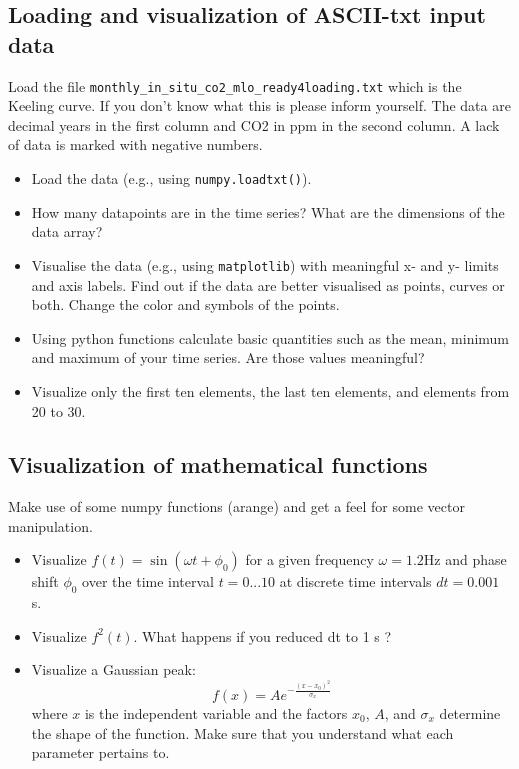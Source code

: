 \subsection{Loading and visualization of ASCII-txt input data}
\label{sec:viskeeling}
Load the file \verb|monthly_in_situ_co2_mlo_ready4loading.txt| which is the Keeling curve. If you don't know what this is please inform yourself. The data are decimal years in the first column and CO2 in ppm in the second column. A lack of data is marked with negative numbers.
\begin{itemize}
\item Load the data (e.g., using \verb|numpy.loadtxt()|).
\item How many datapoints are in the time series? What are the dimensions of the data array?
\item Visualise the data (e.g., using \verb|matplotlib|) with  meaningful x- and y- limits and axis labels. Find out if the data are better visualised as points, curves or both. Change the color and symbols of the points.
\item Using python functions calculate basic quantities such as the mean, minimum and maximum of your time series. Are those values meaningful?
\item Visualize only the first ten elements, the last ten elements, and elements from 20 to 30.
\end{itemize}

\subsection{Visualization of mathematical functions}
\label{sec:mathfunc}
Make use of some numpy functions (arange) and get a feel for some vector manipulation.
\begin{itemize}
  \item Visualize $f(t)=\sin(\omega t + \phi_0)$ for a given frequency $\omega=1.2$Hz and phase shift $\phi_0$ over the time interval $t=0...10$ at discrete time intervals $dt=0.001$ s.
  \item Visualize $f^2(t)$. What happens if you reduced dt to 1 s ?
  \item Visualize a Gaussian peak:
  $$
  f(x) = Ae^{-\frac{(x-x_0)^2}{\sigma_x}}
  $$
  where $x$ is the independent variable and the factors $x_0$, $A$, and $\sigma_x$ determine the shape of the function. Make sure that you understand what each parameter pertains to.
\end{itemize}

